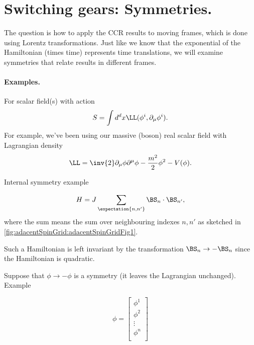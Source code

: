 %
%
\section{Switching gears: Symmetries.}

The question is how to apply the CCR results to moving frames, which is done using Lorentz transformations.  Just like we know that the exponential of the Hamiltonian (times time) represents time translations, we will examine symmetries that relate results in different frames.

\paragraph{Examples.}

For scalar field(s) with action
\begin{dmath}\label{eqn:qftLecture6:880}
S = \int d^d x \LL(\phi^i, \partial_\mu \phi^i).
\end{dmath}
For example, we've been using our massive (boson) real scalar field with Lagrangian density
\begin{dmath}\label{eqn:qftLecture6:900}
\LL = \inv{2} \partial_\mu \phi\partial^\mu \phi - \frac{m^2}{2} \phi^2 - V(\phi).
\end{dmath}

Internal symmetry example

\begin{dmath}\label{eqn:qftLecture6:920}
H = J \sum_{\expectation{n, n'}} \BS_n \cdot \BS_{n'},
\end{dmath}
where the sum means the sum over neighbouring indexes \( n, n' \) as sketched in
\cref{fig:adacentSpinGrid:adacentSpinGridFig1}.

Such a Hamiltonian is left invariant by the transformation \( \BS_n \rightarrow -\BS_n \) since the Hamiltonian is quadratic.

Suppose that \( \phi \rightarrow -\phi\) is a symmetry (it leaves the Lagrangian unchanged).  Example

\begin{dmath}\label{eqn:qftLecture6:940}
\phi =
\begin{bmatrix}
\phi^1 \\
\phi^2 \\
\vdots \\
\phi^n \\
\end{bmatrix}
\end{dmath}

